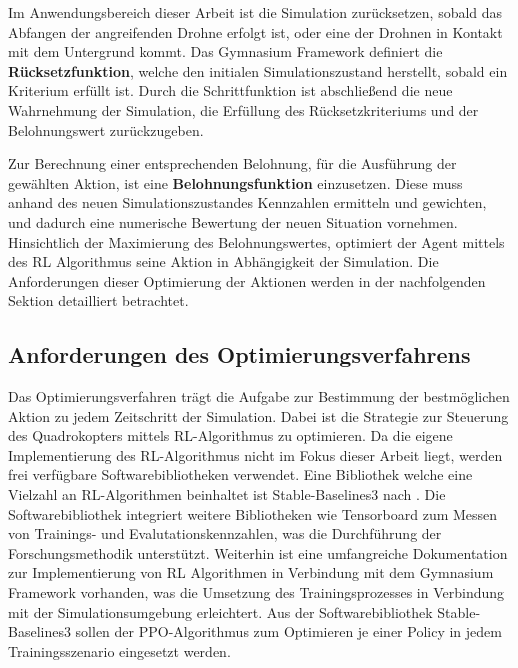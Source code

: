 Im Anwendungsbereich dieser Arbeit ist die Simulation zurücksetzen, sobald das Abfangen der angreifenden Drohne erfolgt ist, oder eine der Drohnen in Kontakt mit dem Untergrund kommt.
Das Gymnasium Framework definiert die \textbf{Rücksetzfunktion}, welche den initialen Simulationszustand herstellt, sobald ein Kriterium erfüllt ist.
Durch die Schrittfunktion ist abschließend die neue Wahrnehmung der Simulation, die Erfüllung des Rücksetzkriteriums und der Belohnungswert zurückzugeben.

Zur Berechnung einer entsprechenden Belohnung, für die Ausführung der gewählten Aktion, ist eine \textbf{Belohnungsfunktion} einzusetzen.
Diese muss anhand des neuen Simulationszustandes Kennzahlen ermitteln und gewichten, und dadurch eine numerische Bewertung der neuen Situation vornehmen.
Hinsichtlich der Maximierung des Belohnungswertes, optimiert der Agent mittels des RL Algorithmus seine Aktion in Abhängigkeit der Simulation. 
Die Anforderungen dieser Optimierung der Aktionen werden in der nachfolgenden Sektion detailliert betrachtet.

\subsection{Anforderungen des Optimierungsverfahrens}

Das Optimierungsverfahren trägt die Aufgabe zur Bestimmung der bestmöglichen Aktion zu jedem Zeitschritt der Simulation.
Dabei ist die Strategie zur Steuerung des Quadrokopters mittels RL-Algorithmus zu optimieren.
Da die eigene Implementierung des RL-Algorithmus nicht im Fokus dieser Arbeit liegt, werden frei verfügbare Softwarebibliotheken verwendet.
Eine Bibliothek welche eine Vielzahl an RL-Algorithmen beinhaltet ist Stable-Baselines3 nach \cite[]{Raffin.2021}.
Die Softwarebibliothek integriert weitere Bibliotheken wie Tensorboard zum Messen von Trainings- und Evalutationskennzahlen, was die Durchführung der Forschungsmethodik unterstützt.
Weiterhin ist eine umfangreiche Dokumentation zur Implementierung von RL Algorithmen in Verbindung mit dem Gymnasium Framework vorhanden, was die Umsetzung des Trainingsprozesses in Verbindung mit der Simulationsumgebung erleichtert.
Aus der Softwarebibliothek Stable-Baselines3 sollen der PPO-Algorithmus zum Optimieren je einer Policy in jedem Trainingsszenario eingesetzt werden. 

